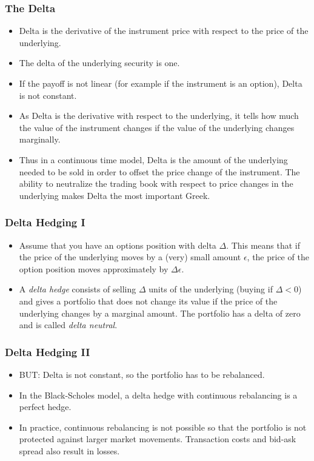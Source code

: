\begin{frame}[fragile]
\frametitle{The Delta}
\begin{itemize}
\item Delta is the derivative of the instrument price with respect to the price
of the underlying.
\item The delta of the underlying security is one.
\item If the payoff is not linear (for example if the instrument is an option),
Delta is not constant.
\item As Delta is the derivative with respect to the underlying, it tells how
much the value of the instrument changes if the value of the underlying changes
marginally.
\item Thus in a continuous time model, Delta is the amount of the underlying
needed to be sold in order to offset the price change of the instrument. The
ability to neutralize the trading book with respect to price changes in the
underlying makes Delta the most important Greek.
\end{itemize}
\end{frame}

\begin{frame}[fragile]
\frametitle{Delta Hedging I}
\begin{itemize}
  \item Assume that you have an options position with delta $\Delta$. This means
  that if the price of the underlying moves by a (very) small amount $\epsilon$, the
  price of the option position moves approximately by $\Delta \epsilon$.
  \item A \emph{delta hedge} consists of selling $\Delta$ units of the
  underlying (buying if $\Delta <0$) and gives a portfolio that does not
  change its value if the price of the underlying changes by a marginal amount.
  The portfolio has a delta of zero and is called \emph{delta neutral}.
\end{itemize}
\end{frame}

\begin{frame}[fragile]
\frametitle{Delta Hedging II}
\begin{itemize}
  \item BUT: Delta is not constant, so the portfolio has to be rebalanced.
  \item In the Black-Scholes model, a delta hedge with continuous rebalancing is
  a perfect hedge.
  \item In practice, continuous rebalancing is not possible so that the
  portfolio is not protected against larger market movements. Transaction
  costs and bid-ask spread also result in losses.
\end{itemize}
\end{frame} 
 


